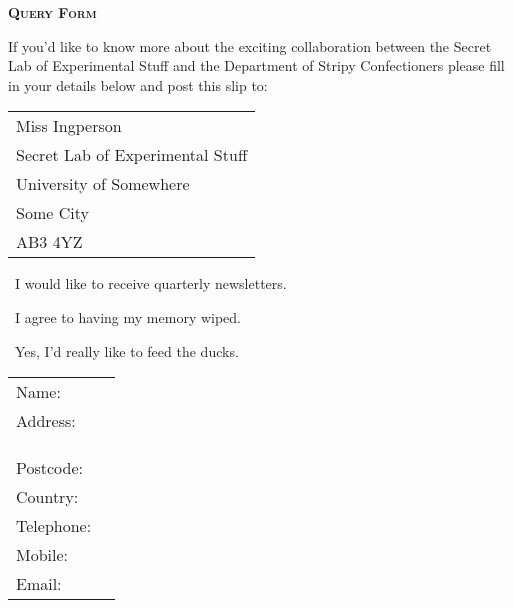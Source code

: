 \documentclass[12pt]{scrartcl}
\newcommand{\cutline}[1][4em]{%
  \par\noindent
  \ifthispageodd
  {%
   \hspace*{-\dimexpr1in+\hoffset+\oddsidemargin}%
  }%
  {%
   \hspace*{-\dimexpr1in+\hoffset+\evensidemargin}%
  }%
  \rlap{%
   \makebox[\paperwidth][l]{%
     \makebox[#1]{\dotfill}\ding{33}\dotfill%
  }}\par
}
\begin{document}
\begin{center}\Large\bfseries\scshape
Query Form
\end{center}

If you'd like to know more about the exciting collaboration between
the Secret Lab of Experimental Stuff and the Department of Stripy
Confectioners please fill in your details below and post this slip to:

\bigskip

\begin{tabular}{@{}l}
Miss Ingperson\\
Secret Lab of Experimental Stuff\\
University of Somewhere\\
Some City\\
AB3 4YZ
\end{tabular} 

\bigskip

\cutline

\bigskip

\Square\ I would like to receive quarterly newsletters.

\Square\ I agree to having my memory wiped.

\Square\ Yes, I'd really like to feed the ducks.

\bigskip

\begin{tabular}{@{}lp{.5\linewidth}}
Name: & \dotfill \\
Address: & \dotfill\\
 & \dotfill \\
 & \dotfill \\
 & \dotfill \\
Postcode: & \dotfill\\
Country: & \dotfill\\
Telephone: & \dotfill\\
Mobile: & \dotfill\\
Email: & \dotfill
\end{tabular}
\end{document}
